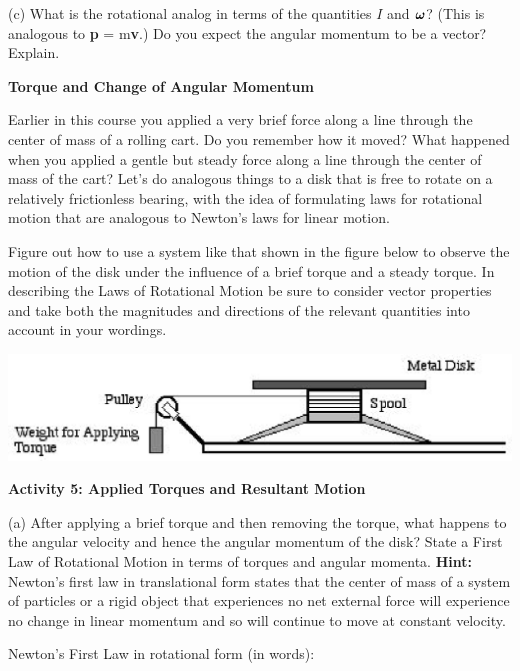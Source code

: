 (c) What is the rotational analog in terms of the quantities $I$ and \( 
\mbox{\boldmath$\omega$}  \)? (This is analogous to \textbf{p} = m\textbf{v}.)
Do you expect the angular momentum to be a vector? Explain.
\vspace{30mm}

\textbf{Torque and Change of Angular Momentum }

Earlier in this course you applied a very brief force along a line through the
center of mass of a rolling cart. Do you remember how it moved? What happened
when you applied a gentle but steady force along a line through the center of
mass of the cart? Let's do analogous things to a disk that is free to rotate
on a relatively frictionless bearing, with the idea of formulating laws for
rotational motion that are analogous to Newton's laws for linear motion. 

Figure out how to use a system like that shown in the figure below to observe
the motion of the disk under the influence of a brief torque and a steady torque.
In describing the Laws of Rotational Motion be sure to consider vector properties
and take both the magnitudes and directions of the relevant quantities into
account in your wordings. 

\vspace{0.3cm}
{\par\centering \includegraphics{ang_mom_fig6.eps} \par}
\vspace{0.3cm}

\textbf{Activity 5: Applied Torques and Resultant Motion }

(a) After applying a brief torque and then removing the torque, what happens to the angular velocity and hence the angular momentum of the
disk? State a First Law of Rotational Motion in terms of torques and angular momenta. \textbf{Hint:} Newton's first law in translational form states that the center of mass of a system of particles or a rigid object that experiences no net external force will experience no change in linear momentum and so will continue to move at constant velocity.

Newton's First Law in rotational form (in words):
\vspace{20mm}

